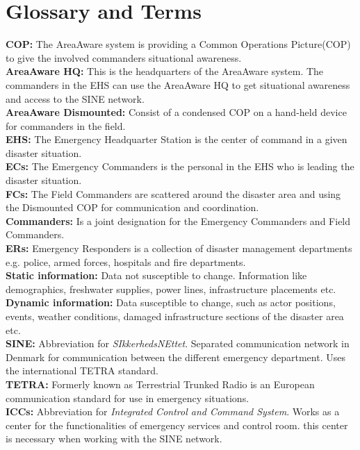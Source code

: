 
\chapter{Glossary and Terms}

\textbf{COP:} The AreaAware system is providing a Common Operations Picture(COP) to give the involved commanders situational awareness.\\

\noindent \textbf{AreaAware HQ:} This is the headquarters of the AreaAware system. The commanders in the EHS can use the AreaAware HQ to get situational awareness and access to the SINE network.\\

\noindent \textbf{AreaAware Dismounted:} Consist of a condensed COP on a hand-held device for commanders in the field.\\

\noindent \textbf{EHS:} The Emergency Headquarter Station is the center of command in a given disaster situation.\\

\noindent \textbf{ECs:} The Emergency Commanders is the personal in the EHS who is leading the disaster situation.\\

\noindent \textbf{FCs:} The Field Commanders are scattered around the disaster area and using the Dismounted COP for communication and coordination.\\

\noindent \textbf{Commanders:} Is a joint designation for the Emergency Commanders and Field Commanders.\\

\noindent \textbf{ERs:} Emergency Responders is a collection of disaster management departments e.g. police, armed forces, hospitals and fire departments.\\

\noindent \textbf{Static information:} Data not susceptible to change. Information like demographics, freshwater supplies, power lines, infrastructure placements etc.\\

\noindent \textbf{Dynamic information:} Data susceptible to change, such as actor positions, events, weather conditions, damaged infrastructure sections of the disaster area etc.\\

\noindent \textbf{SINE:} Abbreviation for \textit{SIkkerhedsNEttet}. Separated communication network in Denmark for communication between the different emergency department. Uses the international TETRA standard.\\

\noindent \textbf{TETRA:} Formerly known as Terrestrial Trunked Radio is an European communication standard for use in emergency situations.\\

\noindent \textbf{ICCs:} Abbreviation for \textit{Integrated Control and Command System}. Works as a center for the functionalities of emergency services and control room. this center is necessary when working with the SINE network.\\ 



